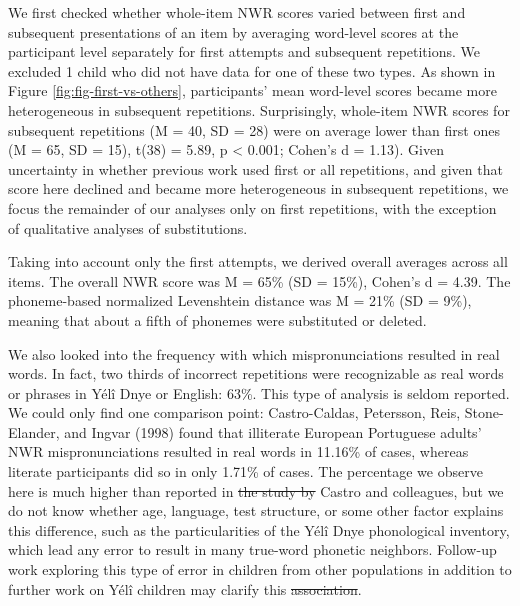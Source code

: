\documentclass[english,,man,floatsintext]{apa6} %
\providecommand{\DIFaddtex}[1]{{\protect\color{blue}\uwave{#1}}} %
\providecommand{\DIFdeltex}[1]{{\protect\color{red}\sout{#1}}}                      %
\providecommand{\DIFaddbegin}{} %
\providecommand{\DIFaddend}{} %
\providecommand{\DIFdelbegin}{} %
\providecommand{\DIFdelend}{} %
\providecommand{\DIFadd}[1]{\texorpdfstring{\DIFaddtex{#1}}{#1}} %
\providecommand{\DIFdel}[1]{\texorpdfstring{\DIFdeltex{#1}}{}} %
\newcommand{\DIFscaledelfig}{0.5}
\newlength{\DIFdelgraphicswidth} %
\newlength{\DIFdelgraphicsheight} %
\newcommand{\DIFaddincludegraphics}[2][]{{\color{blue}\fbox{\DIFOincludegraphics[#1]{#2}}}} %
\newcommand{\DIFdelincludegraphics}[2][]{%
	\sbox{\DIFdelgraphicsbox}{\DIFOincludegraphics[#1]{#2}}%
	\settoboxwidth{\DIFdelgraphicswidth}{\DIFdelgraphicsbox} %
	\settoboxtotalheight{\DIFdelgraphicsheight}{\DIFdelgraphicsbox} %
	\scalebox{\DIFscaledelfig}{%
		\parbox[b]{\DIFdelgraphicswidth}{\usebox{\DIFdelgraphicsbox}\\[-\baselineskip] \rule{\DIFdelgraphicswidth}{0em}}\llap{\resizebox{\DIFdelgraphicswidth}{\DIFdelgraphicsheight}{%
				\setlength{\unitlength}{\DIFdelgraphicswidth}%
				\begin{picture}(1,1)%
				\thicklines\linethickness{2pt} %
				{\color[rgb]{1,0,0}\put(0,0){\framebox(1,1){}}}%
				{\color[rgb]{1,0,0}\put(0,0){\line( 1,1){1}}}%
				{\color[rgb]{1,0,0}\put(0,1){\line(1,-1){1}}}%
				\end{picture}%
			}\hspace*{3pt}}} %
} %
\DeclareRobustCommand{\DIFaddbegin}{\DIFOaddbegin \let\includegraphics\DIFaddincludegraphics} %
\DeclareRobustCommand{\DIFaddend}{\DIFOaddend \let\includegraphics\DIFOincludegraphics} %
\DeclareRobustCommand{\DIFdelbegin}{\DIFOdelbegin \let\includegraphics\DIFdelincludegraphics} %
\DeclareRobustCommand{\DIFdelend}{\DIFOaddend \let\includegraphics\DIFOincludegraphics} %
\begin{document}
We first checked whether whole-item NWR scores varied between first and subsequent presentations of an item by averaging word-level scores at the participant level separately for first attempts and subsequent repetitions. We excluded 1 child who did not have data for one of these two types. As shown in Figure \ref{fig:fig-first-vs-others}, participants' mean word-level scores became more heterogeneous in subsequent repetitions. Surprisingly, whole-item NWR scores for subsequent repetitions (M = 40, SD = 28)
were on average lower than first ones (M = 65, SD = 15), t(38) = 5.89, p \textless{} 0.001; Cohen's d = 1.13). Given uncertainty in whether previous work used first or all repetitions, and given that score here declined and became more heterogeneous in subsequent repetitions, we focus the remainder of our analyses only on first repetitions, with the exception of qualitative analyses of substitutions.

Taking into account only the first attempts, we derived overall averages across all items. The overall NWR score was M = 65\% (SD = 15\%), Cohen's d = 4.39. The phoneme-based normalized Levenshtein distance was M = 21\% (SD = 9\%), meaning that about a fifth of phonemes were substituted or deleted.

We also looked into the frequency with which mispronunciations resulted in real words. In fact, two thirds of incorrect repetitions were recognizable as real words or phrases in Yélî Dnye or English: 63\%. This type of analysis is seldom reported. We could only find one comparison point: Castro-Caldas, Petersson, Reis, Stone-Elander, and Ingvar (1998) found that illiterate European Portuguese adults' NWR mispronunciations resulted in real words in 11.16\% of cases, whereas literate participants did so in only 1.71\% of cases. The percentage we observe here is much higher than reported in \DIFdelbegin \DIFdel{the study by }\DIFdelend Castro and colleagues\DIFaddbegin \DIFadd{' study}\DIFaddend , but we do not know whether age, language, test structure, or some other factor explains this difference, such as the particularities of the Yélî Dnye phonological inventory, which lead any error to result in many true-word phonetic neighbors. Follow-up work exploring this type of error in children from other populations in addition to further work on Yélî children may clarify this \DIFdelbegin \DIFdel{association}\DIFdelend \DIFaddbegin \DIFadd{effect}\DIFaddend .
\end{document}
